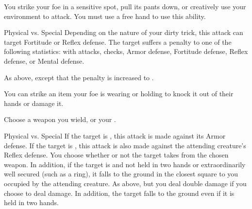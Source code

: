            \label{Dirty Trick} You strike your foe in a sensitive spot, pull its pants down, or creatively use your environment to attack.
            You must use a free hand to use this ability.
            \begin{ability}
                \begin{spelltargetinginfo}
                \end{spelltargetinginfo}
                \begin{spelleffects}
                    \begin{spellattack}{Physical vs. Special}
                        \spellspecial Depending on the nature of your dirty trick, this attack can target Fortitude or Reflex defense.
                        \spellsuccess The target suffers a  penalty to one of the following statistics:
                         with  attacks,  checks, Armor defense, Fortitude defense, Reflex defense, or Mental defense.

                        \spellcritical As above, except that the penalty is increased to .
                    \end{spellattack}
                \end{spelleffects}
            \end{ability}

            \label{Disarm} You can strike an item your foe is wearing or holding to knock it out of their hands or damage it.
            \begin{ability}
                \begin{spelltargetinginfo}
                    \spellspecial Choose a weapon you wield, or your .
                \end{spelltargetinginfo}
                \begin{spelleffects}
                    \begin{spellattack}{Physical vs. Special}
                        \spellspecial If the target is , this attack is made against its Armor defense.
                        If the target is , this attack is also made against the attending creature's Reflex defense.
                        \spellsuccess You choose whether or not the target takes  from the chosen weapon.
                        In addition, if the target is  and not held in two hands or extraordinarily well secured (such as a ring), it falls to the ground in the closest square to you occupied by the attending creature.
                        \spellcritical As above, but you deal double damage if you choose to deal damage.
                        In addition, the target falls to the ground even if it is held in two hands.
                    \end{spellattack}
                \end{spelleffects}
            \end{ability}

